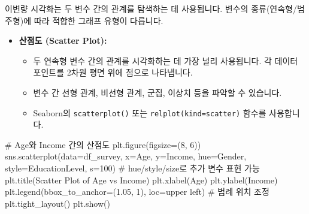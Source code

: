 \documentclass[
  letterpaper,
]{book}
\newenvironment{Shaded}{\begin{snugshade}}{\end{snugshade}}
\newcommand{\CommentTok}[1]{\textcolor[rgb]{0.37,0.37,0.37}{#1}}
\newcommand{\DecValTok}[1]{\textcolor[rgb]{0.68,0.00,0.00}{#1}}
\newcommand{\FloatTok}[1]{\textcolor[rgb]{0.68,0.00,0.00}{#1}}
\newcommand{\NormalTok}[1]{\textcolor[rgb]{0.00,0.23,0.31}{#1}}
\newcommand{\OperatorTok}[1]{\textcolor[rgb]{0.37,0.37,0.37}{#1}}
\newcommand{\StringTok}[1]{\textcolor[rgb]{0.13,0.47,0.30}{#1}}
\providecommand{\tightlist}{%
  \setlength{\itemsep}{0pt}\setlength{\parskip}{0pt}}
\begin{document}
이변량 시각화는 두 변수 간의 관계를 탐색하는 데 사용됩니다. 변수의
종류(연속형/범주형)에 따라 적합한 그래프 유형이 다릅니다.

\begin{itemize}
\tightlist
\item
  \textbf{산점도 (Scatter Plot):}

  \begin{itemize}
  \tightlist
  \item
    두 연속형 변수 간의 관계를 시각화하는 데 가장 널리 사용됩니다. 각
    데이터 포인트를 2차원 평면 위에 점으로 나타냅니다.
  \item
    변수 간 선형 관계, 비선형 관계, 군집, 이상치 등을 파악할 수
    있습니다.
  \item
    Seaborn의 \texttt{scatterplot()} 또는
    \texttt{relplot(kind=\textquotesingle{}scatter\textquotesingle{})}
    함수를 사용합니다.
  \end{itemize}
\end{itemize}

\begin{Shaded}
\begin{Highlighting}[]
\CommentTok{\# Age와 Income 간의 산점도}
\NormalTok{plt.figure(figsize}\OperatorTok{=}\NormalTok{(}\DecValTok{8}\NormalTok{, }\DecValTok{6}\NormalTok{))}
\NormalTok{sns.scatterplot(data}\OperatorTok{=}\NormalTok{df\_survey, x}\OperatorTok{=}\StringTok{\textquotesingle{}Age\textquotesingle{}}\NormalTok{, y}\OperatorTok{=}\StringTok{\textquotesingle{}Income\textquotesingle{}}\NormalTok{, hue}\OperatorTok{=}\StringTok{\textquotesingle{}Gender\textquotesingle{}}\NormalTok{, style}\OperatorTok{=}\StringTok{\textquotesingle{}EducationLevel\textquotesingle{}}\NormalTok{, s}\OperatorTok{=}\DecValTok{100}\NormalTok{) }\CommentTok{\# hue/style/size로 추가 변수 표현 가능}
\NormalTok{plt.title(}\StringTok{\textquotesingle{}Scatter Plot of Age vs Income\textquotesingle{}}\NormalTok{)}
\NormalTok{plt.xlabel(}\StringTok{\textquotesingle{}Age\textquotesingle{}}\NormalTok{)}
\NormalTok{plt.ylabel(}\StringTok{\textquotesingle{}Income\textquotesingle{}}\NormalTok{)}
\NormalTok{plt.legend(bbox\_to\_anchor}\OperatorTok{=}\NormalTok{(}\FloatTok{1.05}\NormalTok{, }\DecValTok{1}\NormalTok{), loc}\OperatorTok{=}\StringTok{\textquotesingle{}upper left\textquotesingle{}}\NormalTok{) }\CommentTok{\# 범례 위치 조정}
\NormalTok{plt.tight\_layout()}
\NormalTok{plt.show()}
\end{Highlighting}
\end{Shaded}
\end{document}
